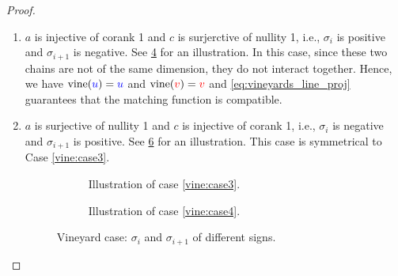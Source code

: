 \documentclass{article}
\newcommand{\vine}{\mathrm{vine}}
\begin{document}
\begin{proof}
\begin{enumerate}
\begin{enumerate}
\begin{enumerate}
							In both cases, these deathpoint matching are compatible thanks to
							\cref{eq:vineyards_line_proj}.
							The matching function is therefore also compatible.
					\end{enumerate}
			\end{enumerate}
			\begin{figure}[H]
				\centering
				\begin{subfigure}[b]{.45\textwidth}
					
					\caption{Illustration of case \ref{vine:case2i}.}
					\label{fig:vine2.i}
				\end{subfigure}
				\hfill
				\begin{subfigure}[b]{.45\textwidth}
					
					\caption{Illustration of case \ref{vine:case2ii}.}
					\label{fig:vine2.ii}
				\end{subfigure}
				\caption{Vineyard case: $\sigma_i$ and $\sigma _{i+1 }$ positive.}
			\end{figure}
		\item \label{vine:case3} $a$ is injective of corank 1 and $c$ is surjerctive of nullity 1, i.e., $\sigma_i$ is positive and $\sigma_{i+1}$ is negative.
			See \cref{fig:vine3} for an illustration.
			In this case, since these two chains are not of the same
			dimension, they do not interact together. Hence, we have
			$\vine(\u)=\u$ and $\vine(\v) = \v$ and
			\cref{eq:vineyards_line_proj} guarantees that the matching
			function is compatible.
		\item \label{vine:case4}  $a$ is surjective of nullity 1 and $c$ is
			injective of corank 1, i.e., $\sigma_i$ is negative and
			$\sigma_{i+1}$ is positive.
			See \cref{fig:vine4} for an illustration.
			This case is symmetrical to Case
			\ref{vine:case3}.
			\begin{figure}[H]
				\centering
				\begin{subfigure}[b]{.35\textwidth}
					
					\caption{Illustration of case \ref{vine:case3}.}
					\label{fig:vine3}
				\end{subfigure}
				\hfill
				\begin{subfigure}[b]{.35\textwidth}
					
					\caption{Illustration of case \ref{vine:case4}.}
					\label{fig:vine4}
				\end{subfigure}
				\caption{Vineyard case: $\sigma_i$ and $\sigma _{i+1 }$ of different signs.}
			\end{figure}
	\end{enumerate}
\end{proof}
\end{document}
